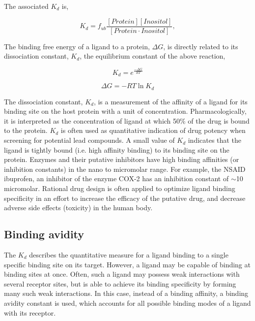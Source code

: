 The associated $K_{d}$ is,

 \begin{equation}
  K_{d} = f_{ub}\frac{\left[ Protein \right]\left[ Inositol \right]}{\left[Protein \cdot Inositol\right]},
 \end{equation}
   
The binding free energy of a ligand to a protein, $\Delta G$, is directly related to its dissociation constant, $K_d$, the equilibrium constant of the above reaction,

\begin{equation}
	K_{d} = e^{\frac{-\Delta G}{RT}}
\end{equation}

\begin{equation}
	\Delta G = -RT\ln K_d
\end{equation}

The dissociation constant, $K_d$, is a measurement of the affinity of a ligand for its binding site on the host protein with a unit of concentration. Pharmacologically, it is interpreted as the concentration of ligand at which 50\% of the drug is bound to the protein. $K_d$ is often used as quantitative indication of drug potency when screening for potential lead compounds.
A small value of $K_d$ indicates that the ligand is tightly bound (i.e. high affinity binding) to its binding site on the protein. Enzymes and their putative inhibitors have high binding affinities (or inhibition constants) in the nano to micromolar range. For example, the NSAID ibuprofen, an inhibitor of the enzyme COX-2 has an inhibition constant of $\sim$10 micromolar.\cite{Cryer:1998ti} Rational drug design is often applied to optimize ligand binding specificity in an effort to increase the efficacy of the putative drug, and decrease adverse side effects (toxicity) in the human body.

\subsection{Binding avidity}
The $K_{d}$ describes the quantitative measure for a ligand binding to a single specific binding site on its target. However, a ligand may be capable of binding at binding sites at once. Often, such a ligand may possess weak interactions with several receptor sites, but is able to achieve its binding specificity by forming many such weak interactions. In this case, instead of a binding affinity, a binding avidity constant is used, which accounts for all possible binding modes of a ligand with its receptor.

